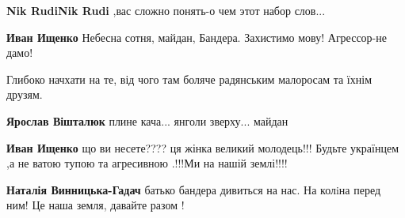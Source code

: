 \begin{itemize}
\begin{itemize}
\begin{itemize}
\textbf{Nik RudiNik Rudi} ,вас сложно понять-о чем этот набор слов...

 
\textbf{Иван Ищенко} Небесна сотня, майдан, Бандера. Захистимо мову! Агрессор-не дамо!

 
Глибоко начхати на те, від чого там боляче радянським малоросам та їхнім друзям.

 
\textbf{Ярослав Вішталюк} плине кача... янголи зверху... майдан

 
\textbf{Иван Ищенко} що ви несете???? ця жінка великий молодець!!! Будьте українцем ,а не ватою тупою та агресивною .!!!Ми на нашій землі!!!!

 
\textbf{Наталія Винницька-Гадач} батько бандера дивиться на нас. На колiна перед ним! Це наша земля, давайте разом !

 

\end{itemize}
\end{itemize}
\end{itemize}
